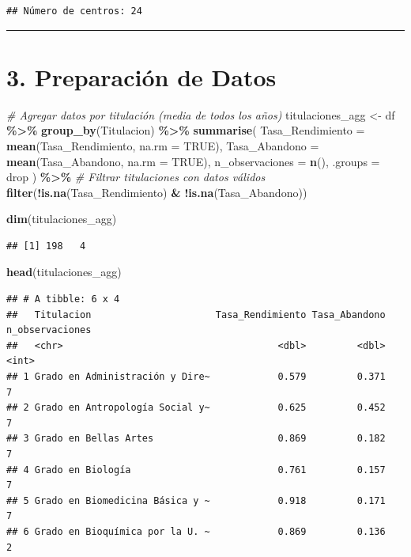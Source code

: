 \documentclass[
]{article}
\newenvironment{Shaded}{\begin{snugshade}}{\end{snugshade}}
\newcommand{\AttributeTok}[1]{\textcolor[rgb]{0.13,0.29,0.53}{#1}}
\newcommand{\CommentTok}[1]{\textcolor[rgb]{0.56,0.35,0.01}{\textit{#1}}}
\newcommand{\ConstantTok}[1]{\textcolor[rgb]{0.56,0.35,0.01}{#1}}
\newcommand{\FunctionTok}[1]{\textcolor[rgb]{0.13,0.29,0.53}{\textbf{#1}}}
\newcommand{\NormalTok}[1]{#1}
\newcommand{\OtherTok}[1]{\textcolor[rgb]{0.56,0.35,0.01}{#1}}
\newcommand{\SpecialCharTok}[1]{\textcolor[rgb]{0.81,0.36,0.00}{\textbf{#1}}}
\newcommand{\StringTok}[1]{\textcolor[rgb]{0.31,0.60,0.02}{#1}}
\begin{document}
\begin{verbatim}
## Número de centros: 24
\end{verbatim}

\begin{center}\rule{0.5\linewidth}{0.5pt}\end{center}

\section{3. Preparación de Datos}\label{preparaciuxf3n-de-datos}

\begin{Shaded}
\begin{Highlighting}[]
\CommentTok{\# Agregar datos por titulación (media de todos los años)}
\NormalTok{titulaciones\_agg }\OtherTok{\textless{}{-}}\NormalTok{ df }\SpecialCharTok{\%\textgreater{}\%}
  \FunctionTok{group\_by}\NormalTok{(Titulacion) }\SpecialCharTok{\%\textgreater{}\%}
  \FunctionTok{summarise}\NormalTok{(}
    \AttributeTok{Tasa\_Rendimiento =} \FunctionTok{mean}\NormalTok{(Tasa\_Rendimiento, }\AttributeTok{na.rm =} \ConstantTok{TRUE}\NormalTok{),}
    \AttributeTok{Tasa\_Abandono =} \FunctionTok{mean}\NormalTok{(Tasa\_Abandono, }\AttributeTok{na.rm =} \ConstantTok{TRUE}\NormalTok{),}
    \AttributeTok{n\_observaciones =} \FunctionTok{n}\NormalTok{(),}
    \AttributeTok{.groups =} \StringTok{\textquotesingle{}drop\textquotesingle{}}
\NormalTok{  ) }\SpecialCharTok{\%\textgreater{}\%}
  \CommentTok{\# Filtrar titulaciones con datos válidos}
  \FunctionTok{filter}\NormalTok{(}\SpecialCharTok{!}\FunctionTok{is.na}\NormalTok{(Tasa\_Rendimiento) }\SpecialCharTok{\&} \SpecialCharTok{!}\FunctionTok{is.na}\NormalTok{(Tasa\_Abandono))}

\FunctionTok{dim}\NormalTok{(titulaciones\_agg)}
\end{Highlighting}
\end{Shaded}

\begin{verbatim}
## [1] 198   4
\end{verbatim}

\begin{Shaded}
\begin{Highlighting}[]
\FunctionTok{head}\NormalTok{(titulaciones\_agg)}
\end{Highlighting}
\end{Shaded}

\begin{verbatim}
## # A tibble: 6 x 4
##   Titulacion                      Tasa_Rendimiento Tasa_Abandono n_observaciones
##   <chr>                                      <dbl>         <dbl>           <int>
## 1 Grado en Administración y Dire~            0.579         0.371               7
## 2 Grado en Antropología Social y~            0.625         0.452               7
## 3 Grado en Bellas Artes                      0.869         0.182               7
## 4 Grado en Biología                          0.761         0.157               7
## 5 Grado en Biomedicina Básica y ~            0.918         0.171               7
## 6 Grado en Bioquímica por la U. ~            0.869         0.136               2
\end{verbatim}
\end{document}
